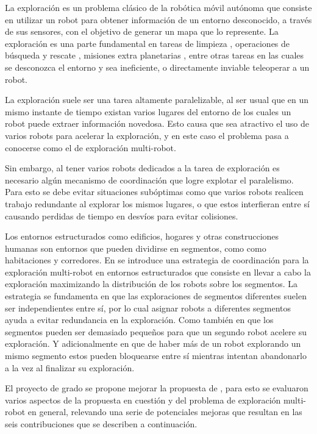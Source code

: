 La exploración es un problema clásico de la robótica móvil autónoma que
consiste en utilizar un robot para obtener información de un entorno
desconocido, a través de sus sensores, con el objetivo de generar un mapa que lo
represente. La exploración es una parte fundamental en tareas de limpieza
\cite{luo2002real}, operaciones de búsqueda y rescate \cite{Liu2015}, misiones
extra planetarias \cite{schuster2019towards}, entre otras tareas en las cuales
se desconozca el entorno y sea ineficiente, o directamente inviable teleoperar
a un robot.

La exploración suele ser una tarea altamente paralelizable, al ser usual que en
un mismo instante de tiempo existan varios lugares del entorno de los cuales un
robot puede extraer información novedosa. Esto causa que sea atractivo el uso
de varios robots para acelerar la exploración, y en este caso el problema pasa
a conocerse como el de exploración multi-robot.

Sin embargo, al tener varios robots dedicados a la tarea de exploración es
necesario algún mecanismo de coordinación que logre explotar el paralelismo.
Para esto se debe evitar situaciones subóptimas como que varios robots realicen
trabajo redundante al explorar los mismos lugares, %
o que estos interfieran entre sí causando perdidas de tiempo en desvíos para
evitar colisiones.

Los entornos estructurados como edificios, hogares y otras construcciones
humanas son entornos que pueden dividirse en segmentos, como como habitaciones
y corredores. En \cite{wurm2008coordinated} se introduce una estrategia de
coordinación para la exploración multi-robot en entornos estructurados que
consiste en llevar a cabo la exploración maximizando la distribución de los
robots sobre los segmentos. La estrategia se fundamenta en que las
exploraciones de segmentos diferentes suelen ser independientes entre sí, por
lo cual asignar robots a diferentes segmentos ayuda a evitar redundancia en la
exploración. Como también en que los segmentos pueden ser demasiado pequeños
para que un segundo robot acelere su exploración. Y adicionalmente en que de
haber más de un robot explorando un mismo segmento estos pueden bloquearse
entre sí mientras intentan abandonarlo a la vez al finalizar su exploración.

El proyecto de grado se propone mejorar la propuesta de
\cite{wurm2008coordinated}, para esto se evaluaron varios aspectos de la
propuesta en cuestión y del problema de exploración multi-robot en general,
relevando una serie de potenciales mejoras que resultan en las seis
contribuciones que se describen a continuación.

